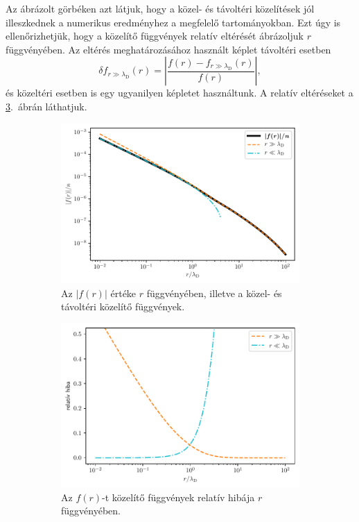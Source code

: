 \documentclass[a4paper,12pt,titlepage]{article}
\begin{document}
Az ábrázolt görbéken azt látjuk, hogy a közel- és távoltéri közelítések jól illeszkednek a numerikus eredményhez a megfelelő tartományokban.  Ezt úgy is ellenőrizhetjük, hogy a közelítő függvények relatív eltérését ábrázoljuk $r$ függvényében.  Az eltérés meghatározásához használt képlet távoltéri esetben
$$ \delta f_{r \gg \lambda_\text{D}}(r) = \left| \frac{f(r) - f_{r \gg \lambda_\text{D}}(r)}{f(r)} \right|, $$
és közeltéri esetben is egy ugyanilyen képletet használtunk.  A relatív eltéréseket a \ref{F-sc-error-fig}.\ ábrán láthatjuk.

\begin{figure}[h!]
	\centering
	\begin{subfigure}{0.48\linewidth}
		\centering
		\includegraphics[width=\linewidth]{F_sc.pdf}
		\caption{\centering Az $\left| f(r) \right|$ értéke $r$ függvényében, illetve a közel- és távoltéri közelítő függvények.}
		\label{F-sc-fig}
	\end{subfigure}%
	\begin{subfigure}{0.48\linewidth}
		\centering
		\includegraphics[width=0.98\linewidth]{F_sc_error.pdf}
		\caption{\centering Az $f(r)$-t közelítő függvények relatív hibája $r$ függvényében.}
		\label{F-sc-error-fig}
	\end{subfigure}
	\caption{}
\end{figure}
\end{document}
